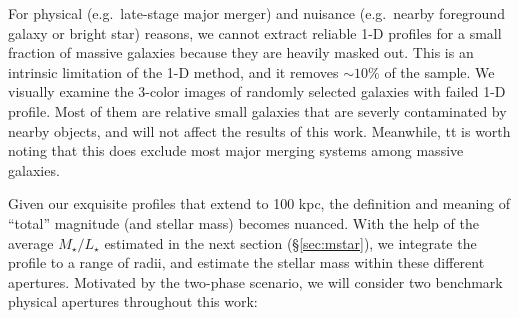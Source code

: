 \documentclass[a4paper,fleqn,usenatbib]{mnras}
\def\rbcg{\texttt{cenHighMh}}
\def\nbcg{\texttt{cenLowMh}}
\def\m2l{{$M_{\star}/L_{\star}$}}
\begin{document}
    
    For physical (e.g.\ late-stage major merger) and nuisance (e.g.\ nearby foreground 
    galaxy or bright star) reasons, we cannot extract reliable 1-D profiles for a small 
    fraction of massive galaxies because they are heavily masked out. 
    This is an intrinsic limitation of the 1-D method, and it removes ${\sim}10$\% of 
    the sample.
    We visually examine the 3-color images of randomly selected galaxies with failed 
    1-D profile.  
    Most of them are relative small galaxies that are severly contaminated by nearby 
    objects, and will not affect the results of this work.  
    Meanwhile, tt is worth noting that this does exclude most major merging systems 
    among massive galaxies. 
        
    Given our exquisite profiles that extend to 100 kpc, the definition and meaning 
    of ``total'' magnitude (and stellar mass) becomes nuanced.
    With the help of the average \m2l{} estimated in the next section 
    (\S \ref{sec:mstar}), we integrate the profile to a range of radii, and estimate 
    the stellar mass within these different apertures.  
    Motivated by the two-phase scenario, we will consider two benchmark physical 
    apertures throughout this work:
    
\end{document}
